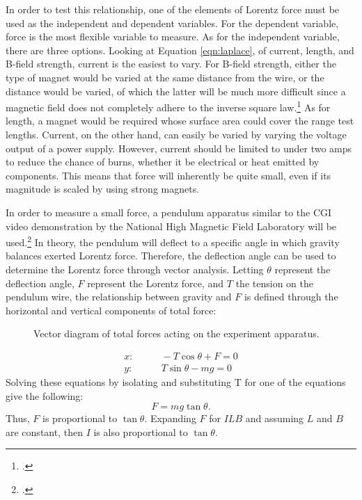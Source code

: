 In order to test this relationship, one of the elements of Lorentz force must be used as the independent and dependent variables.
For the dependent variable, force is the most flexible variable to measure.
As for the independent variable, there are three options.
Looking at Equation \eqref{eqn:laplace}, of current, length, and B-field strength, current is the easiest to vary.
For B-field strength, either the type of magnet would be varied at the same distance from the wire, or the distance would be varied, of which the latter will be much more difficult since a magnetic field does not completely adhere to the inverse square law.\footcite{wwdistance}
As for length, a magnet would be required whose surface area could cover the range test lengths.
Current, on the other hand, can easily be varied by varying the voltage output of a power supply.
However, current should be limited to under two amps to reduce the chance of burns, whether it be electrical or heat emitted by components.
This means that force will inherently be quite small, even if its magnitude is scaled by using strong magnets.

In order to measure a small force, a pendulum apparatus similar to the CGI video demonstration by the National High Magnetic Field Laboratory will be used.\footcite{nmllorentz}
In theory, the pendulum will deflect to a specific angle in which gravity balances exerted Lorentz force.
Therefore, the deflection angle can be used to determine the Lorentz force through vector analysis.
Letting $\theta$ represent the deflection angle, $F$ represent the Lorentz force, and $T$ the tension on the pendulum wire, the relationship between gravity and $F$ is defined through the horizontal and vertical components of total force:
\begin{figure}[t!]
	\centering
	\caption{Vector diagram of total forces acting on the experiment apparatus.}
	\vspace{-1.5em}
	\label{fig:vector}
\end{figure}
\begin{align*}
	x:& \qquad -T \cos\theta + F =0 \\
	y:& \qquad T \sin\theta - mg =0
\end{align*}
Solving these equations by isolating and substituting T for one of the equations give the following:
\begin{equation}
	F = mg \tan\theta \text{.} \label{eqn:experiment}
\end{equation}
Thus, $F$ is proportional to $\tan\theta$. Expanding $F$ for $ILB$ and assuming $L$ and $B$ are constant, then $I$ is also proportional to $\tan\theta$.
